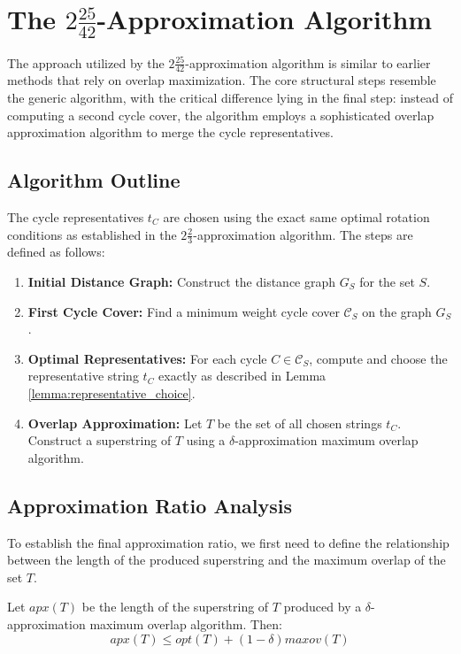 \section{The $2\frac{25}{42}$-Approximation Algorithm}

The approach utilized by the $2\frac{25}{42}$-approximation algorithm is similar
to earlier methods that rely on overlap maximization. The core structural steps
resemble the generic algorithm, with the critical difference lying in the final
step: instead of computing a second cycle cover, the algorithm employs a
sophisticated overlap approximation algorithm to merge the cycle
representatives.

\subsection{Algorithm Outline}
The cycle representatives $t_C$ are chosen using the exact same optimal rotation
conditions as established in the $2\frac{2}{3}$-approximation algorithm. The
steps are defined as follows:

\begin{enumerate}
    \item \textbf{Initial Distance Graph:} Construct the distance graph $G_S$
    for the set $S$.
    \item \textbf{First Cycle Cover:} Find a minimum weight cycle cover
    $\mathcal{C}_S$ on the graph $G_S$.
    \item \textbf{Optimal Representatives:} For each cycle $C \in
    \mathcal{C}_S$, compute and choose the representative string $t_C$ exactly
    as described in Lemma \ref{lemma:representative_choice}.
    \item \textbf{Overlap Approximation:} Let $T$ be the set of all chosen
    strings $t_C$. Construct a superstring of $T$ using a $\delta$-approximation
    maximum overlap algorithm.
\end{enumerate}

\subsection{Approximation Ratio Analysis}
To establish the final approximation ratio, we first need to define the
relationship between the length of the produced superstring and the maximum
overlap of the set $T$.

\begin{lemma} \label{lemma:apx_overlap}
Let $apx(T)$ be the length of the superstring of $T$ produced by a
$\delta$-approximation maximum overlap algorithm. Then:
\begin{equation}
apx(T) \le opt(T) + (1 - \delta)\textit{maxov}(T)
\end{equation}
\end{lemma}

